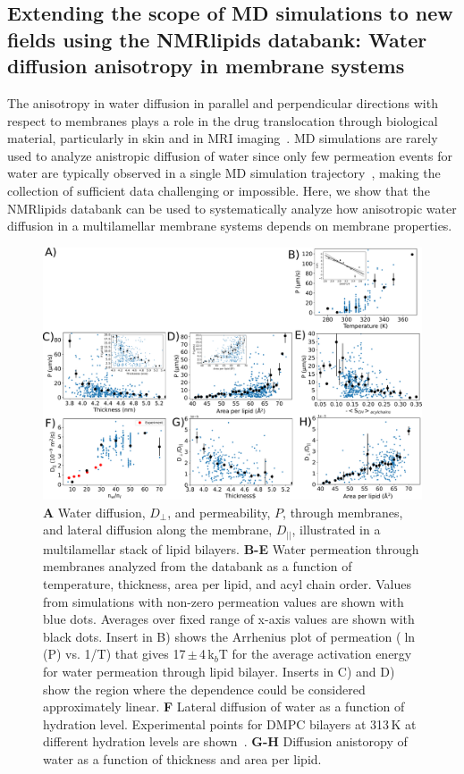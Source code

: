 \documentclass[fleqn,10pt]{wlscirep}
\begin{document}
\subsection{Extending the scope of MD simulations to new fields using the NMRlipids databank: Water diffusion anisotropy in membrane systems}
The anisotropy in water diffusion in parallel and perpendicular directions with respect to membranes plays a role in the drug translocation through biological material, particularly in skin \cite{hansen13,wen18,nitsche19,roberts21} and in MRI imaging~\cite{topgaard20}. MD simulations are rarely used to analyze anistropic diffusion of water since only few permeation events for water are typically observed in a single MD simulation trajectory~\cite{venable19,camilo2022}, making the collection of sufficient data challenging or impossible. Here, we show that the NMRlipids databank can be used to systematically analyze how anisotropic water diffusion in a multilamellar membrane systems depends on membrane properties. 

\begin{figure}[tb]
    \centering
    \includegraphics[width=180mm]{Figures/permeation2.pdf}
    \caption{{\bf A} Water diffusion, $D_\perp$, and permeability, $P$, through membranes, and lateral diffusion along the membrane, $D_{||}$, illustrated in a multilamellar stack of lipid bilayers. 
    {\bf B-E} Water permeation through membranes analyzed from the databank as a function of temperature, thickness, area per lipid, and acyl chain order. Values from simulations with non-zero permeation values are shown with blue dots. Averages over fixed range of x-axis values are shown with black dots. Insert in B) shows the Arrhenius plot of permeation ($\ln$ (P) vs. 1/T) that gives 17\,$\pm$\,4\,k$_b$T for the average activation energy for water permeation through lipid bilayer. Inserts in C) and D) show the region where the dependence could be considered approximately linear.
    {\bf F} Lateral diffusion of water as a function of hydration level. Experimental points for DMPC bilayers at 313\,K at different hydration levels are shown~\cite{rudakova04}.
    {\bf G-H} Diffusion anistoropy of water as a function of thickness and area per lipid. }
    \label{fig:permeability}
\end{figure}
\end{document}
